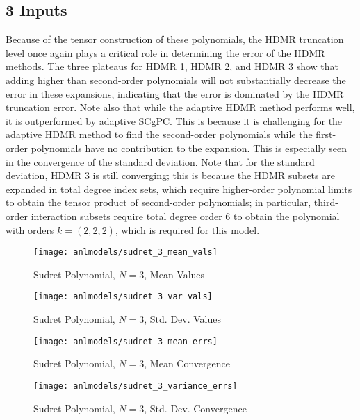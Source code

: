 \subsection{3 Inputs}
Because of the tensor construction of these polynomials, the HDMR truncation level once again plays a critical
role in determining the error of the HDMR methods.  The three plateaus for HDMR 1, HDMR 2, and HDMR 3 show
that adding higher than second-order polynomials will not substantially decrease the error in these
expansions, indicating that the error is dominated by the HDMR truncation error.  Note also that while the
adaptive HDMR method performs well, it is outperformed by adaptive SCgPC.  This is because it is challenging
for the adaptive HDMR method to find the second-order polynomials while the first-order polynomials have no
contribution to the expansion.  This is especially seen in the convergence of the standard deviation.  Note
that for the standard deviation, HDMR 3 is still converging; this is because the HDMR subsets are expanded in
total degree index sets, which require higher-order polynomial limits to obtain the tensor product of
second-order polynomials; in particular, third-order interaction subsets require total degree order 6 to
obtain the polynomial with orders $k=(2,2,2)$, which is required for this model.
\begin{figure}[H]
  \centering
  \texttt{[image: anlmodels/sudret\_3\_mean\_vals]}
  \caption{Sudret Polynomial, $N=3$, Mean Values}
  \label{fig:hdmr sudretpoly mean values 3}
\end{figure}
\begin{figure}[H]
  \centering
  \texttt{[image: anlmodels/sudret\_3\_var\_vals]}
  \caption{Sudret Polynomial, $N=3$, Std. Dev. Values}
  \label{fig:hdmr sudretpoly var values 3}
\end{figure}

\begin{figure}[H]
  \centering
  \texttt{[image: anlmodels/sudret\_3\_mean\_errs]}
  \caption{Sudret Polynomial, $N=3$, Mean Convergence}
  \label{fig:hdmr sudretpoly mean errors 3}
\end{figure}
\begin{figure}[H]
  \centering
  \texttt{[image: anlmodels/sudret\_3\_variance\_errs]}
  \caption{Sudret Polynomial, $N=3$, Std. Dev. Convergence}
  \label{fig:hdmr sudretpoly var errors 3}
\end{figure}

